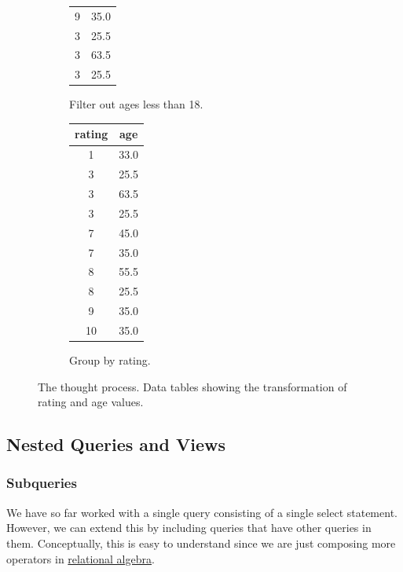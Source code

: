 \begin{example}
\begin{figure}[H]
\begin{subfigure}[b]{0.32\textwidth}
\begin{tabular}{|c|c|}
            9 & 35.0 \\
            3 & 25.5 \\
            3 & 63.5 \\
            3 & 25.5 \\
            \hline
          \end{tabular}
          \caption{Filter out ages less than 18.}
          \label{fig:table2}
        \end{subfigure}
        \hfill 
        \begin{subfigure}[b]{0.32\textwidth}
          \centering
          \begin{tabular}{|c|c|}
            \hline
            rating & age \\
            \hline
            1 & 33.0 \\
            \hline 
            3 & 25.5 \\
            3 & 63.5 \\
            3 & 25.5 \\
            \hline 
            7 & 45.0 \\
            7 & 35.0 \\
            \hline 
            8 & 55.5 \\
            8 & 25.5 \\
            \hline 
            9 & 35.0 \\
            \hline 
            10 & 35.0 \\
            \hline
          \end{tabular}
          \caption{Group by rating.}
          \label{fig:table3}
        \end{subfigure}
        \caption{The thought process. Data tables showing the transformation of rating and age values. }
        \label{fig:rating-age-tables}
      \end{figure}
    \end{example}

\subsection{Nested Queries and Views} 

  \subsubsection{Subqueries}

    We have so far worked with a single query consisting of a single select statement. However, we can extend this by including queries that have other queries in them. Conceptually, this is easy to understand since we are just composing more operators in \hyperref[def:relational-algebra]{relational algebra}. 


